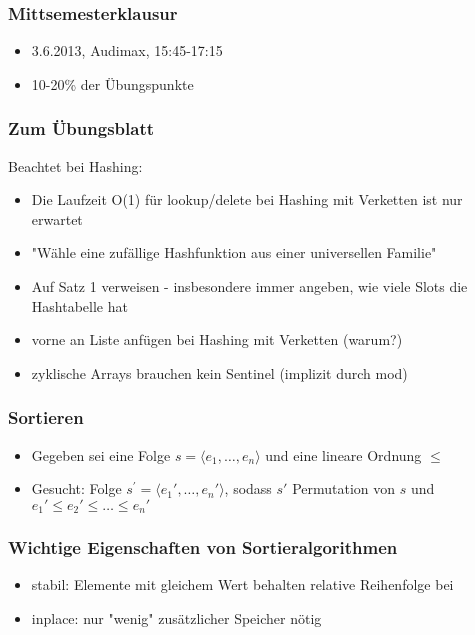 

\begin{frame}
  \titlepage
\end{frame}

\begin{frame}
\frametitle{Mittsemesterklausur}
\begin{itemize}
\item 3.6.2013, Audimax, 15:45-17:15
\item 10-20\% der Übungspunkte
\end{itemize}
\end{frame}

\begin{frame}
\frametitle{Zum Übungsblatt}
Beachtet bei Hashing:
\begin{itemize}
\item Die Laufzeit O(1) für lookup/delete bei Hashing mit Verketten ist nur erwartet
\item "Wähle eine zufällige Hashfunktion aus einer universellen Familie"
\item Auf Satz 1 verweisen - insbesondere immer angeben, wie viele Slots die Hashtabelle hat
\item vorne an Liste anfügen bei Hashing mit Verketten (warum?)
\item zyklische Arrays brauchen kein Sentinel (implizit durch mod)
\end{itemize}
\end{frame}

\begin{frame}
\frametitle{Sortieren}
\begin{itemize}
\item Gegeben sei eine Folge $s=\langle e_1,\ldots,e_n\rangle$ und eine lineare Ordnung $\leq$
\item Gesucht: Folge $s^\prime=\langle e_1\prime,\ldots,e_n\prime\rangle$, sodass $s\prime$ Permutation von $s$ und $e_1\prime\leq e_2\prime\leq\ldots\leq e_n\prime$
\end{itemize}
\end{frame}

\begin{frame}
\frametitle{Wichtige Eigenschaften von Sortieralgorithmen}
\begin{itemize}
\item stabil: Elemente mit gleichem Wert behalten relative Reihenfolge bei
\item inplace: nur "wenig" zusätzlicher Speicher nötig
\end{itemize}
\end{frame}

